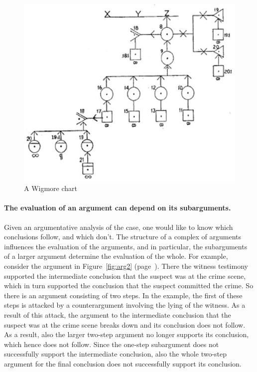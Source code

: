 \documentclass[10pt]{article}
\begin{document}
\begin{figure}[bt]
	\centering
		\includegraphics[scale=0.7]{img/wigmore.jpg}
\caption{A Wigmore chart\label{fig:wigmore}}
\end{figure}

\paragraph{The evaluation of an argument can depend on its subarguments.}Given an argumentative analysis of the case, one would like to know which conclusions follow, and which don't. 
The structure of a complex of arguments influences the evaluation of the arguments, and in particular, the subarguments of a larger argument determine the evaluation of the whole. 
For example, consider the argument in Figure~\ref{fig:arg2} (page~\pageref{fig:arg2}). There the witness testimony supported the intermediate conclusion that the suspect was at the crime scene, which in turn supported the conclusion that the suspect committed the crime. So there is an argument consisting of two steps. In the example, the first of these steps is attacked by a counterargument involving the lying of the witness. As a result of this attack, the argument to the intermediate conclusion that the suspect was at the crime scene breaks down and its conclusion does not follow. As a result, also the larger two-step argument no longer supports its conclusion, which hence does not follow. Since the one-step subargument does not successfully support the intermediate conclusion, also the whole two-step argument for the final conclusion does not successfully support its conclusion.
\end{document}
